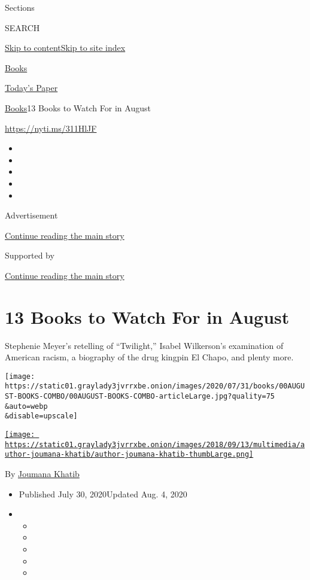 Sections

SEARCH

\protect\hyperlink{site-content}{Skip to
content}\protect\hyperlink{site-index}{Skip to site index}

\href{https://www.nytimes3xbfgragh.onion/section/books}{Books}

\href{https://myaccount.nytimes3xbfgragh.onion/auth/login?response_type=cookie\&client_id=vi}{}

\href{https://www.nytimes3xbfgragh.onion/section/todayspaper}{Today's
Paper}

\href{/section/books}{Books}\textbar{}13 Books to Watch For in August

\url{https://nyti.ms/311HlJF}

\begin{itemize}
\item
\item
\item
\item
\item
\end{itemize}

Advertisement

\protect\hyperlink{after-top}{Continue reading the main story}

Supported by

\protect\hyperlink{after-sponsor}{Continue reading the main story}

\hypertarget{13-books-to-watch-for-in-august}{%
\section{13 Books to Watch For in
August}\label{13-books-to-watch-for-in-august}}

Stephenie Meyer's retelling of ``Twilight,'' Isabel Wilkerson's
examination of American racism, a biography of the drug kingpin El
Chapo, and plenty more.

\texttt{[image: https://static01.graylady3jvrrxbe.onion/images/2020/07/31/books/00AUGUST-BOOKS-COMBO/00AUGUST-BOOKS-COMBO-articleLarge.jpg?quality=75\\\&auto=webp\\\&disable=upscale]}

\href{https://nytimes3xbfgragh.onion/by/joumana-khatib}{\texttt{[image: https://static01.graylady3jvrrxbe.onion/images/2018/09/13/multimedia/author-joumana-khatib/author-joumana-khatib-thumbLarge.png]}}

By \href{https://nytimes3xbfgragh.onion/by/joumana-khatib}{Joumana
Khatib}

\begin{itemize}
\item
  Published July 30, 2020Updated Aug. 4, 2020
\item
  \begin{itemize}
  \item
  \item
  \item
  \item
  \item
  \end{itemize}
\end{itemize}

